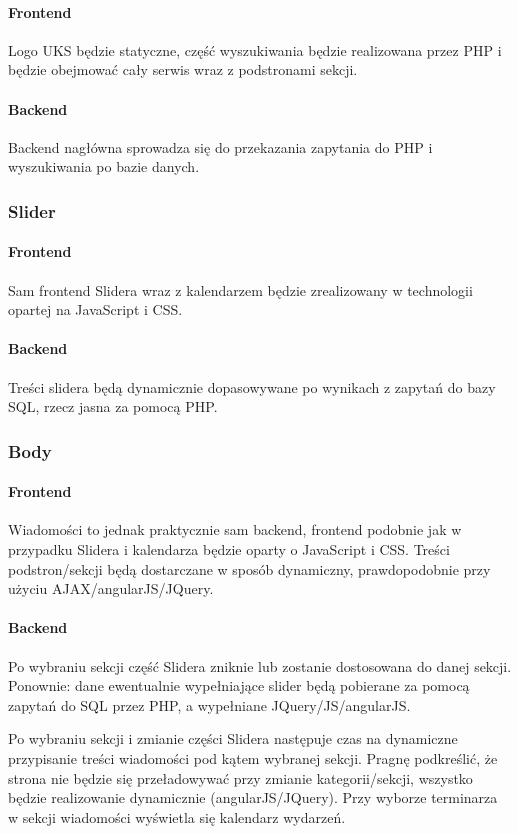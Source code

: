 \documentclass{scrartcl}
\begin{document}
\paragraph{Frontend}
Logo UKS będzie statyczne, część wyszukiwania będzie realizowana przez PHP i będzie obejmować cały serwis wraz z podstronami sekcji.
\paragraph{Backend}
Backend nagłówna sprowadza się do przekazania zapytania do PHP i wyszukiwania po bazie danych.
\subsubsection{Slider}
\paragraph{Frontend}
Sam frontend Slidera wraz z kalendarzem będzie zrealizowany w technologii opartej na JavaScript i CSS.
\paragraph{Backend}
Treści slidera będą dynamicznie dopasowywane po wynikach z zapytań do bazy SQL, rzecz jasna za pomocą PHP. 
\subsubsection{Body}
\paragraph{Frontend}
Wiadomości to jednak praktycznie sam backend, frontend podobnie jak w przypadku Slidera i kalendarza będzie oparty o JavaScript i CSS. Treści podstron/sekcji będą dostarczane w sposób dynamiczny, prawdopodobnie przy użyciu AJAX/angularJS/JQuery.
\paragraph{Backend}
Po wybraniu sekcji część Slidera zniknie lub zostanie dostosowana do danej sekcji. Ponownie: dane ewentualnie wypełniające slider będą pobierane za pomocą zapytań do SQL przez PHP, a wypełniane JQuery/JS/angularJS.

Po wybraniu sekcji i zmianie części Slidera następuje czas na dynamiczne przypisanie treści wiadomości pod kątem wybranej sekcji. Pragnę podkreślić, że strona nie będzie się przeładowywać przy zmianie kategorii/sekcji, wszystko będzie realizowanie dynamicznie (angularJS/JQuery). Przy wyborze terminarza w sekcji wiadomości wyświetla się kalendarz wydarzeń. 
\end{document}
